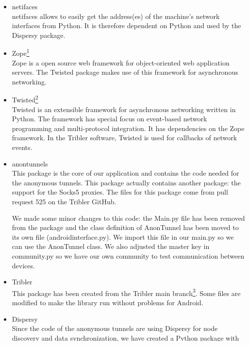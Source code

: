 \begin{itemize}
			\item netifaces\\
			netifaces allows to easily get the address(es) of the machine's network interfaces from Python. It is therefore dependent on Python and used by the Dispersy package.
		
			\item Zope\footnote{http://www.zope.org/}\\
			Zope is a open source web framework for object-oriented web application servers. The Twisted package makes use of this framework for asynchronous networking.
		
			\item Twisted\footnote{https://twistedmatrix.com/trac/}\\
			Twisted is an extensible framework for asynchronous networking written in Python. The framework has special focus on event-based network programming and multi-protocol integration. It has dependencies on the Zope framework. In the Tribler software, Twisted is used for callbacks of network events.
		
			\item anontunnels\\
			This package is the core of our application and contains the code needed for the anonymous tunnels. This package actually contains another package: the support for the Socks5 proxies. The files for this package come from pull request 525 on the Tribler GitHub.
			
			We made some minor changes to this code: the Main.py file has been removed from the package and the class definition of AnonTunnel has been moved to its own file (androidinterface.py). We import this file in our main.py so we can use the AnonTunnel class. We also adjusted the master key in community.py so we have our own community to test communication between devices.
			
			\item Tribler\\
			This package has been created from the Tribler main branch\footnote{https://github.com/Tribler/tribler}. Some files are modified to make the library run without problems for Android.
			
			\item Dispersy\\
			Since the code of the anonymous tunnels are using Dispersy for node discovery and data synchronization, we have created a Python package with all the code thats needed for Dispersy. This package does not depend on other custom packages we made and can be used standalone.\\
			The files we have bundled are from pull request 525 on the Tribler GitHub. We did not use the files from the official Dispersy GitHub because this build was missing some classes we needed (for example, the decorator.py). Besides that, some changes in the pull request have been made to the Dispersy core to add support for the anonymous tunnels.
		
		\end{itemize}
	
